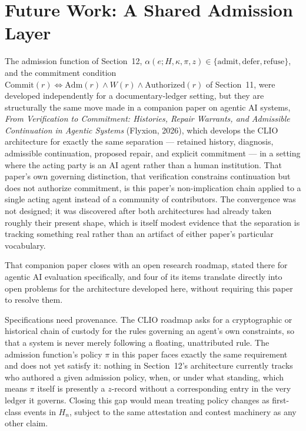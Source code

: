 \documentclass[11pt,oneside]{article}
\theoremstyle{plain}
\theoremstyle{definition}
\begin{document}
\section{Future Work: A Shared Admission Layer}

The admission function of Section~12, $\alpha(e; H, \kappa, \pi, z) \in \{\mathrm{admit}, \mathrm{defer}, \mathrm{refuse}\}$, and the commitment condition $\mathrm{Commit}(r) \iff \mathrm{Adm}(r) \land W(r) \land \mathrm{Authorized}(r)$ of Section~11, were developed independently for a documentary-ledger setting, but they are structurally the same move made in a companion paper on agentic AI systems, \emph{From Verification to Commitment: Histories, Repair Warrants, and Admissible Continuation in Agentic Systems} (Flyxion, 2026), which develops the CLIO architecture for exactly the same separation --- retained history, diagnosis, admissible continuation, proposed repair, and explicit commitment --- in a setting where the acting party is an AI agent rather than a human institution. That paper's own governing distinction, that verification constrains continuation but does not authorize commitment, is this paper's non-implication chain applied to a single acting agent instead of a community of contributors. The convergence was not designed; it was discovered after both architectures had already taken roughly their present shape, which is itself modest evidence that the separation is tracking something real rather than an artifact of either paper's particular vocabulary.

That companion paper closes with an open research roadmap, stated there for agentic AI evaluation specifically, and four of its items translate directly into open problems for the architecture developed here, without requiring this paper to resolve them.

Specifications need provenance. The CLIO roadmap asks for a cryptographic or historical chain of custody for the rules governing an agent's own constraints, so that a system is never merely following a floating, unattributed rule. The admission function's policy $\pi$ in this paper faces exactly the same requirement and does not yet satisfy it: nothing in Section~12's architecture currently tracks who authored a given admission policy, when, or under what standing, which means $\pi$ itself is presently a $z$-record without a corresponding entry in the very ledger it governs. Closing this gap would mean treating policy changes as first-class events in $H_n$, subject to the same attestation and contest machinery as any other claim.
\end{document}
